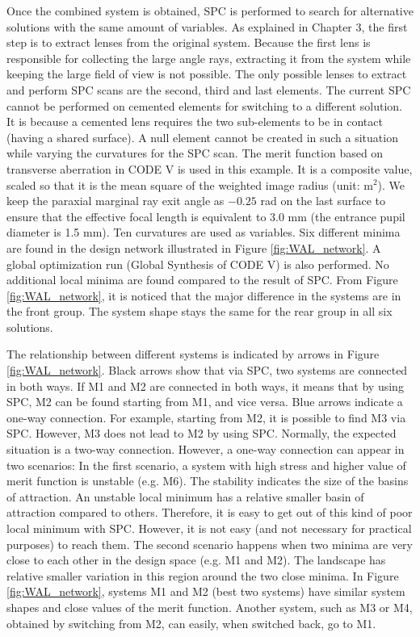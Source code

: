 Once the combined system is obtained, SPC is performed to search for alternative solutions with the same amount of variables. As explained in Chapter 3, the first step is to extract lenses from the original system. Because the first lens is responsible for collecting the large angle rays, extracting it from the system while keeping the large field of view is not possible. The only possible lenses to extract and perform SPC scans are the second, third and last elements. The current SPC cannot be performed on cemented elements for switching to a different solution. It is because a cemented lens requires the two sub-elements to be in contact (having a shared surface). A null element cannot be created in such a situation while varying the curvatures for the SPC scan. The merit function based on transverse aberration in CODE V is used in this example. It is a composite value, scaled so that it is the mean square of the weighted image radius (unit: \textmu m$^2$). We keep the paraxial marginal ray exit angle as $-0.25$ rad on the last surface to ensure that the effective focal length is equivalent to $3.0$ mm (the entrance pupil diameter is 1.5 mm). Ten curvatures are used as variables. Six different minima are found in the design network illustrated in Figure \ref{fig:WAL_network}. A global optimization run (Global Synthesis of CODE V) is also performed. No additional local minima are found compared to the result of SPC. From Figure \ref{fig:WAL_network}, it is noticed that the major difference in the systems are in the front group. The system shape stays the same for the rear group in all six solutions.

The relationship between different systems is indicated by arrows in Figure \ref{fig:WAL_network}. Black arrows show that via SPC, two systems are connected in both ways. If M1 and M2 are connected in both ways, it means that by using SPC, M2 can be found starting from M1, and vice versa. Blue arrows indicate a one-way connection. For example, starting from M2, it is possible to find M3 via SPC. However, M3 does not lead to M2 by using SPC. Normally, the expected situation is a two-way connection. However, a one-way connection can appear in two scenarios: In the first scenario, a system with high stress and higher value of merit function is unstable (e.g. M6). The stability indicates the size of the basins of attraction. An unstable local minimum has a relative smaller basin of attraction compared to others. Therefore, it is easy to get out of this kind of poor local minimum with SPC. However, it is not easy (and not necessary for practical purposes) to reach them. The second scenario happens when two minima are very close to each other in the design space (e.g. M1 and M2). The landscape has relative smaller variation in this region around the two close minima. In Figure \ref{fig:WAL_network}, systems M1 and M2 (best two systems) have similar system shapes and close values of the merit function. Another system, such as M3 or M4, obtained by switching from M2, can easily, when switched back, go to M1. 

